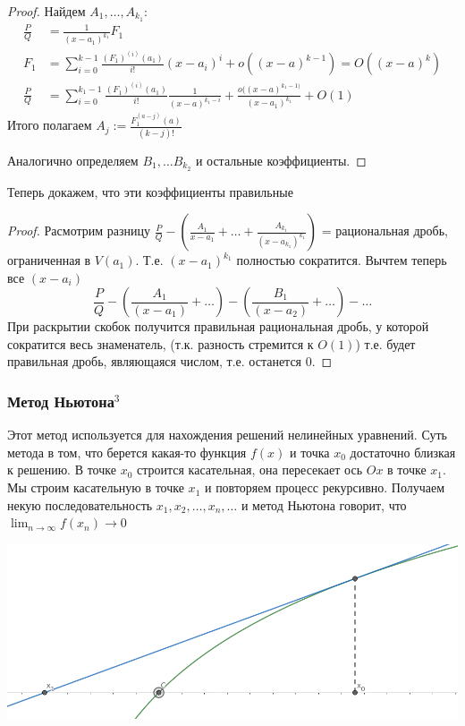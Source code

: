 \documentclass{article}
\begin{document}
\begin{proof}
Найдем $A_1, \ldots, A_{k_1}$:
\begin{align*}
\frac{P}{Q} &= \frac{1} {(x - a_1)^{k_1}} F_1\\
F_1 &= \sum_{i=0}^{k - 1} \frac{(F_1)^{(i)} (a_1)} {i!} (x - a_i)^i + o((x-a)^{k - 1}) = O((x-a)^k)\\
\frac{P}{Q} &= \sum_{i=0}^{k_1 - 1} \frac{(F_1)^{(i)} (a_1)} {i!} \frac{1} {(x-a)^{k_1 - i}} + \frac{o((x-a)^{k_1 - 1)}} {(x - a_1)^{k_1}} + O(1)
\end{align*}
Итого полагаем $A_j := \frac{F_1^{(a - j)} (a)} {(k-j)!}$

Аналогично определяем $B_1, \ldots B_{k_2}$ и остальные коэффициенты.
\end{proof}

Теперь докажем, что эти коэффициенты правильные

\begin{proof}
Расмотрим разницу $\frac{P}{Q} - \left(\frac{A_1} {x - a_1} + \dots + \frac{A_{k_1}} {(x - a_{k_1})^{k_1}} \right)$ = рациональная дробь, ограниченная в $V(a_1)$. Т.е. $(x - a_1)^{k_1}$ полностью сократится. Вычтем теперь все $(x - a_i)$
\begin{equation*}
\frac{P}{Q} - \left(\frac{A_1}{(x - a_1)} + \dots\right) - \left(\frac{B_1}{(x - a_2)} + \dots\right) - \dots
\end{equation*}
При раскрытии скобок получится правильная рациональная дробь, у которой сократится весь знаменатель, (т.к. разность стремится к $O(1)$)  т.е. будет правильная дробь, являющаяся числом, т.е. останется 0.
\end{proof}

\subsubsection{Метод Ньютона\texorpdfstring{$^3$}{}}
Этот метод используется для нахождения решений нелинейных уравнений. Суть метода в том, что берется какая-то функция $f(x)$ и точка $x_0$ достаточно близкая к решению. В точке $x_0$ строится касательная, она пересекает ось $Ox$ в точке $x_1$. Мы строим касательную в точке $x_1$ и повторяем процесс рекурсивно. Получаем некую последовательность $x_1, x_2, \ldots, x_n, \ldots$ и метод Ньютона говорит, что $\lim_{n\to\infty}f(x_n) \to 0$

\begin{center}
    \includegraphics[scale=0.44]{../images/Newton_method.png}
\end{center}
\end{document}
